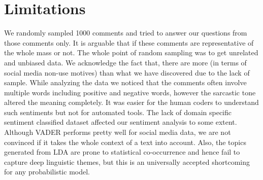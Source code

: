 \section{Limitations}
We randomly sampled 1000 comments and tried to answer our questions from those comments only. It is arguable that if these comments are representative of the whole mass or not. The whole point of random sampling was to get unrelated and unbiased data. We acknowledge the fact that, there are more (in terms of social media non-use motives) than what we have discovered due to the lack of sample. While analyzing the data we noticed that the comments often involve multiple words including positive and negative words, however the sarcastic tone altered the meaning completely. It was easier for the human coders to understand such sentiments but not for automated tools. The lack of domain specific sentiment classified dataset affected our sentiment analysis to some extent. Although VADER performs pretty well for social media data, we are not convinced if it takes the whole context of a text into account. Also, the topics generated from LDA are prone to statistical co-occurrence and hence fail to capture deep linguistic themes, but this is an universally accepted shortcoming for any probabilistic model.

\label{sec:limitations}
